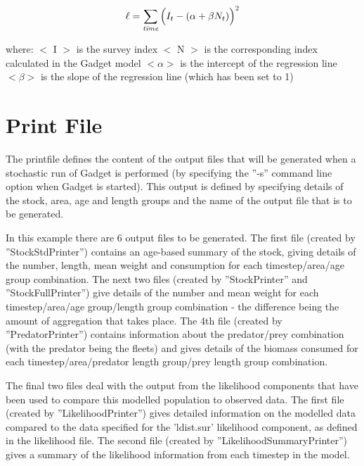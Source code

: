 \documentclass[10pt,twoside]{article}
\begin{document}
\begin{equation}\label{eq:surveyindexex}
\ell = \sum_{\it time}\Big(I_{t} - (\alpha + \beta N_{t})\Big)^2
\end{equation}

where:\newline
$<$ I $>$ is the survey index\newline
$<$ N $>$ is the corresponding index calculated in the Gadget model\newline
$<\alpha>$ is the intercept of the regression line\newline
$<\beta>$ is the slope of the regression line (which has been set to 1)

{\small }

\section{Print File}
The printfile defines the content of the output files that will be generated when a stochastic run of Gadget is performed (by specifying the ''-s'' command line option when Gadget is started).  This output is defined by specifying details of the stock, area, age and length groups and the name of the output file that is to be generated.

\bigskip
In this example there are 6 output files to be generated.  The first file (created by ''StockStdPrinter'') contains an age-based summary of the stock, giving details of the number, length, mean weight and consumption for each timestep/area/age group combination.  The next two files (created by ''StockPrinter'' and ''StockFullPrinter'') give details of the number and mean weight for each timestep/area/age group/length group combination - the difference being the amount of aggregation that takes place.  The 4th file (created by ''PredatorPrinter'') contains information about the predator/prey combination (with the predator being the fleets) and gives details of the biomass consumed for each timestep/area/predator length group/prey length group combination.

\bigskip
The final two files deal with the output from the likelihood components that have been used to compare this modelled population to observed data.  The first file (created by ''LikelihoodPrinter'') gives detailed information on the modelled data compared to the data specified for the 'ldist.sur' likelihood component, as defined in the likelihood file.  The second file (created by ''LikelihoodSummaryPrinter'') gives a summary of the likelihood information from each timestep in the model.
\end{document}
